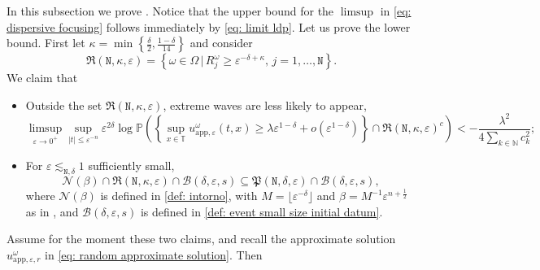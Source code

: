 \documentclass[a4paper,10pt,reqno]{article}
\theoremstyle{definition}
\theoremstyle{plain}
\theoremstyle{plain}
\theoremstyle{definition}
\theoremstyle{plain}
\theoremstyle{plain}
\theoremstyle{plain}
\theoremstyle{definition}
\theoremstyle{definition}
\def \N{\mathbb N}
\def \P{{\mathbb P}}
\def \T{\mathbb{T}}
\def \B{\mathcal{B}}
\def \tN{\mathtt{N}}
\begin{document}
In this subsection we prove .
Notice that the upper bound for the $\limsup$ in \eqref{eq: dispersive focusing} follows immediately by \eqref{eq: limit ldp}.
Let us prove the lower bound.
First let $\kappa = \min \left \{ \frac{\delta}{2} , \frac{1-\delta}{14} \right \}$ and consider
\begin{equation} \label{eq: moduli grandi}
\mathfrak{R}(\tN, \kappa, \varepsilon) = \left \{ \omega \in \mathbb{\Omega} \, | \, R_j^{\omega} \ge \varepsilon^{-\delta + \kappa}, \, j=1,\ldots,\tN \right \}.
\end{equation}
We claim that
\begin{itemize}
\item[(i)] Outside the set $\mathfrak{R}(\tN,\kappa,\varepsilon)$, extreme waves are less likely to appear,
\begin{equation} \label{disp foc 1}
 \limsup_{\varepsilon \to 0^+} \sup_{|t|\leq \varepsilon^{-n}} \varepsilon^{2\delta} \log \P \left( \left \{ \sup_{x \in \T} u_{\mathrm{app},\varepsilon}^{\omega}(t,x) \ge \lambda \varepsilon^{1-\delta} + o(\varepsilon^{1-\delta}) \right \} \cap \mathfrak{R}(\tN,\kappa,\varepsilon)^c \right ) < - \frac{\lambda^2}{4 \sum_{k \in \N} c_k^2};
\end{equation}
    \item[(ii)] For $\varepsilon \lesssim_{\tN,\delta} 1$ sufficiently small,
\begin{equation} \label{inclusion}
\mathcal{N}(\beta) \cap \mathfrak{R}(\tN, \kappa, \varepsilon) \cap \B(\delta,\varepsilon,s) \subseteq \mathfrak{P}(\tN,\delta,\varepsilon) \cap \B(\delta,\varepsilon,s),
\end{equation}
where $\mathcal{N}(\beta)$ is defined in \eqref{def: intorno}, with $M = \lfloor \varepsilon^{-\delta} \rfloor$ and $\beta=M^{-1} \varepsilon^{n+\frac12}$ as in , and $\B(\delta,\varepsilon,s)$ is defined in \eqref{def: event small size initial datum}.
\end{itemize}
Assume for the moment these two claims, and recall the approximate solution $u_{\mathrm{app},\varepsilon,r}^{\omega}$ in \eqref{eq: random approximate solution}. Then 
\end{document}
